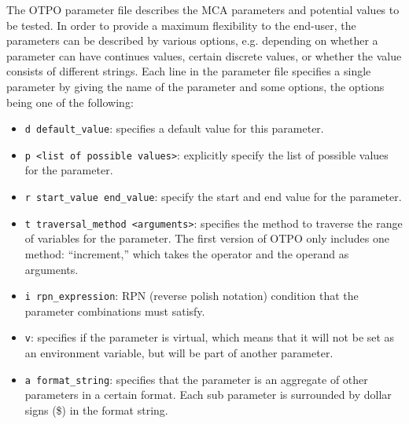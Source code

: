The OTPO parameter file describes the MCA parameters and potential
values to be tested. In order to provide a maximum flexibility to the
end-user, the parameters can be described by various options,
e.g. depending on whether a parameter can have continues values,
certain discrete values, or whether the value consists of different
strings. Each line in the parameter file specifies a single parameter
by giving the name of the parameter and some options, the options
being one of the following:
\begin{itemize}
\item {\tt d default\_\-value}: specifies a default value for this
  parameter.
\item {\tt p <list of possible values>}: explicitly specify the list
  of possible values for the parameter.
\item {\tt r start\_\-value end\_\-value}: specify the start and end
  value for the parameter.
\item {\tt t traversal\_\-method <arguments>}: specifies the method to
  traverse the range of variables for the parameter. The first version
  of OTPO only includes one method: ``increment,'' which takes the
  operator and the operand as arguments.
\item {\tt i rpn\_\-expression}: RPN (reverse polish notation)
  condition that the parameter combinations must satisfy.
\item {\tt v}: specifies if the parameter is virtual, which means that
  it will not be set as an environment variable, but will be part of
  another parameter.
\item {\tt a format\_\-string}: specifies that the parameter is an
  aggregate of other parameters in a certain format. Each sub
  parameter is surrounded by dollar signs (\$) in the format string.
\end{itemize}

